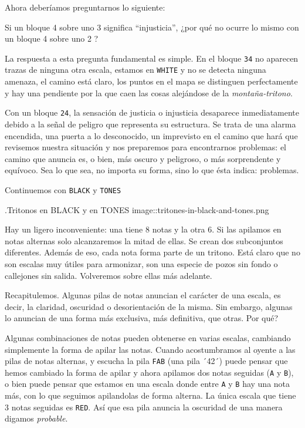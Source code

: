 \documentclass[]{report}
\begin{document}
  Ahora deberíamos preguntarnos lo siguiente:
  
  Si un bloque 4 sobre uno 3 significa ``injusticia'', ¿por qué no ocurre lo mismo con un bloque 4 sobre uno 2 ?
  
  La respuesta a esta pregunta fundamental es simple. En el bloque \texttt{34} no aparecen trazas de ninguna otra escala, estamos en \texttt{WHITE} y no se detecta ninguna amenaza, el camino está claro, los puntos en el mapa se distinguen perfectamente y hay una pendiente por la que caen las cosas alejándose de la \emph{montaña-tritono}.
  
  Con un bloque \texttt{24}, la sensación de justicia o injusticia desaparece inmediatamente debido a la señal de peligro que representa su estructura. Se trata de una alarma encendida, una puerta a lo desconocido, un imprevisto en el camino que hará que revisemos nuestra situación y nos preparemos para encontrarnos problemas: el camino que anuncia es, o bien, más oscuro y peligroso, o más sorprendente y equívoco. Sea lo que sea, no importa su forma, sino lo que ésta indica: problemas.
  
  Continuemos con \texttt{BLACK} y \texttt{TONES}
  
  .Tritonos en BLACK y en TONES image::tritones-in-black-and-tones.png
  
  Hay un ligero inconveniente: una tiene 8 notas y la otra 6. Si las apilamos en notas alternas solo alcanzaremos la mitad de ellas. Se crean dos subconjuntos diferentes. Además de eso, cada nota forma parte de un tritono. Está claro que no son escalas muy útiles para armonizar, son una especie de pozos sin fondo o callejones sin salida. Volveremos sobre ellas más adelante.
  
  Recapitulemos. Algunas pilas de notas anuncian el carácter de una escala, es decir, la claridad, oscuridad o desorientación de la misma. Sin embargo, algunas lo anuncian de una forma más exclusiva, más definitiva, que otras. Por qué?
  
  Algunas combinaciones de notas pueden obtenerse en varias escalas, cambiando simplemente la forma de apilar las notas. Cuando acostumbramos al oyente a las pilas de notas alternas, y escucha la pila \texttt{FAB} (una pila ´42´) puede pensar que hemos cambiado la forma de apilar y ahora apilamos dos notas seguidas (\texttt{A} y \texttt{B}), o bien puede pensar que estamos en una escala donde entre \texttt{A} y \texttt{B} hay una nota más, con lo que seguimos apilandolas de forma alterna. La única escala que tiene 3 notas seguidas es \texttt{RED}. Así que esa pila anuncia la oscuridad de una manera digamos \emph{probable}.
  
\end{document}
